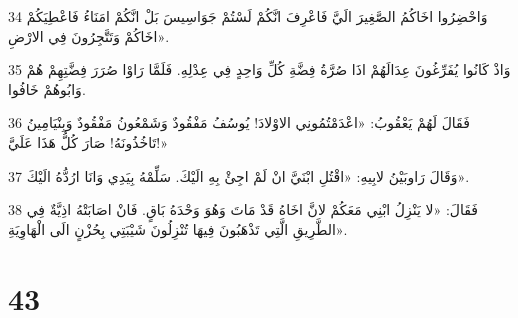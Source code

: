 \par 34 وَاحْضِرُوا اخَاكُمُ الصَّغِيرَ الَيَّ فَاعْرِفَ انَّكُمْ لَسْتُمْ جَوَاسِيسَ بَلْ انَّكُمْ امَنَاءُ فَاعْطِيَكُمْ اخَاكُمْ وَتَتَّجِرُونَ فِي الارْضِ».
\par 35 وَاذْ كَانُوا يُفَرِّغُونَ عِدَالَهُمْ اذَا صُرَّةُ فِضَّةِ كُلِّ وَاحِدٍ فِي عِدْلِهِ. فَلَمَّا رَاوْا صُرَرَ فِضَّتِهِمْ هُمْ وَابُوهُمْ خَافُوا.
\par 36 فَقَالَ لَهُمْ يَعْقُوبُ: «اعْدَمْتُمُونِي الاوْلادَ! يُوسُفُ مَفْقُودٌ وَشَمْعُونُ مَفْقُودٌ وَبِنْيَامِينُ تَاخُذُونَهُ! صَارَ كُلُّ هَذَا عَلَيَّ!»
\par 37 وَقَالَ رَاوبَيْنُ لابِيهِ: «اقْتُلِ ابْنَيَّ انْ لَمْ اجِئْ بِهِ الَيْكَ. سَلِّمْهُ بِيَدِي وَانَا ارُدُّهُ الَيْكَ».
\par 38 فَقَالَ: «لا يَنْزِلُ ابْنِي مَعَكُمْ لانَّ اخَاهُ قَدْ مَاتَ وَهُوَ وَحْدَهُ بَاقٍ. فَانْ اصَابَتْهُ اذِيَّةٌ فِي الطَّرِيقِ الَّتِي تَذْهَبُونَ فِيهَا تُنْزِلُونَ شَيْبَتِي بِحُزْنٍ الَى الْهَاوِيَةِ».

\chapter{43}

